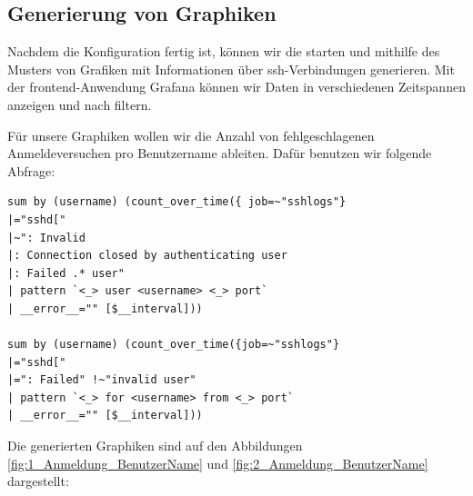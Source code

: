 \newpage
\subsection{Generierung von Graphiken}
Nachdem die Konfiguration fertig ist, können wir die  starten und mithilfe des Musters von \cite{VoidQuark_sshlogs} Grafiken mit Informationen über \gls{ssh}-Verbindungen generieren. Mit der \gls{frontend}-Anwendung Grafana können wir Daten in verschiedenen Zeitspannen anzeigen und nach  filtern. 

Für unsere Graphiken wollen wir die Anzahl von fehlgeschlagenen Anmeldeversuchen pro Benutzername ableiten. Dafür benutzen wir folgende Abfrage: 

{
\begin{Verbatim}[frame=single]
sum by (username) (count_over_time({ job=~"sshlogs"} 
|="sshd[" 
|~": Invalid
|: Connection closed by authenticating user
|: Failed .* user" 
| pattern `<_> user <username> <_> port` 
| __error__="" [$__interval]))

sum by (username) (count_over_time({job=~"sshlogs"}
|="sshd[" 
|=": Failed" !~"invalid user" 
| pattern `<_> for <username> from <_> port` 
| __error__="" [$__interval]))
\end{Verbatim}
}


Die generierten Graphiken sind auf den Abbildungen \ref{fig:1_Anmeldung_BenutzerName} und \ref{fig:2_Anmeldung_BenutzerName} dargestellt:

